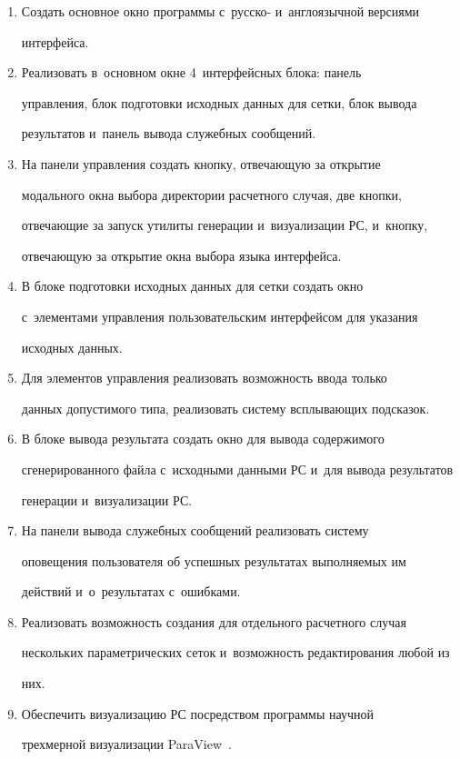   \begin{enumerate}[1.]


\item Создать основное окно программы с~русско- и~англоязычной версиями 


интерфейса. 


\item Реализовать в~основном окне 4~интерфейсных блока: панель 


управления, блок подготовки исходных данных для сетки, блок вывода 


результатов и~панель вывода служебных сообщений.


\item На панели управления создать кнопку, отвечающую за открытие 


модального окна выбора директории расчетного случая, две кнопки, 


отвечающие за запуск утилиты генерации и~визуализации РС, и~кнопку, 


отвечающую за открытие окна выбора языка интерфейса. 


\item В блоке подготовки исходных данных для сетки создать окно 


с~элементами управления пользовательским интерфейсом для указания 


исходных данных.


\item Для элементов управления реализовать возможность ввода только 


данных допустимого типа, реализовать систему всплывающих подсказок.


\item В блоке вывода результата создать окно для вывода содержимого 


сгенерированного файла с~исходными данными РС и~для вывода результатов 


генерации и~визуализации РС.


\item На панели вывода служебных сообщений реализовать систему 


оповещения пользователя об успешных результатах выполняемых им 


действий и~о~результатах с~ошибками.


\item Реализовать возможность создания для отдельного расчетного случая 


нескольких параметрических сеток и~возможность редактирования любой из 


них.


\item Обеспечить визуализацию РС посредством программы научной 


трехмерной визуализации ParaView~\cite{7-ch}.


\end{enumerate}





